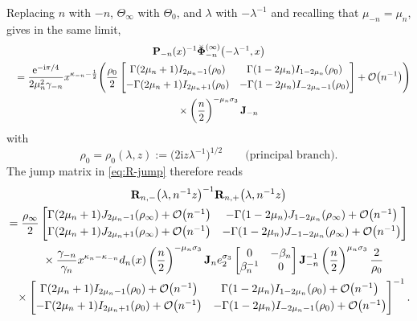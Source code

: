 \documentclass[pdftex]{sigma}
\numberwithin{equation}{section}
\newcommand{\ee}{\mathrm{e}}
\newcommand{\ii}{\mathrm{i}}
\newcommand{\para}[1]{\breve{#1}}
\begin{document}
Replacing $n$ with $-n$, $\Theta_\infty$ with $\Theta_0$, and $\lambda$ with $-\lambda^{-1}$ and recalling that $\mu_{-n} = \mu_n$, gives in the same limit,
\begin{gather*}
 \mathbf{P}_{-n}(x)^{-1}\para{\mathbf{\Phi}}_{-n}^{(\infty)}\bigl(-\lambda^{-1},x\bigr)
\\
 \quad =\frac{\ee^{-\ii\pi/4}}{2\mu_n^2\gamma_{-n}}x^{\kappa_{-n}-\frac{1}{2}}\Bigg(\frac{\rho_0}{2}\begin{bmatrix}{\Gamma(2\mu_n+1)}{} I_{2\mu_n-1}(\rho_0) & {\Gamma(1-2\mu_n)}{} I_{1-2\mu_n}(\rho_0) \vspace{1mm}\\
 -{\Gamma(2\mu_n+1)}{}I_{2\mu_n+1}(\rho_0)&-{\Gamma(1-2\mu_n)}{}I_{-2\mu_n-1}(\rho_0)
 \end{bmatrix} +\mathcal{O}\big(n^{-1}\big)\Bigg)\\
\phantom{ \quad =}{} \times \left(\frac{n}{2}\right)^{-\mu_n \sigma_3}
 \mathbf{J}_{-n}
\end{gather*}
with
\begin{equation}
\rho_0=\rho_0(\lambda,z):=\big(2\ii z\lambda^{-1}\big)^{1/2}\qquad\text{(principal branch)}.
\label{eq:rho-zero-branch}
\end{equation}
The jump matrix in \eqref{eq:R-jump} therefore reads
\begin{gather}
 \mathbf{R}_{n,-}\big(\lambda,n^{-1}z\big)^{-1}
 \mathbf{R}_{n,+}\big(\lambda,n^{-1}z\big) \nonumber\\
 = \frac{\rho_\infty}{2}\begin{bmatrix}
 \Gamma(2\mu_n+1) J_{2\mu_n-1}(\rho_\infty)+ \mathcal{O}\big(n^{-1}\big) & -\Gamma(1-2\mu_n) J_{1-2\mu_n}(\rho_\infty)+ \mathcal{O}\big(n^{-1}\big) \vspace{1mm}\\
 \Gamma(2\mu_n+1) J_{2\mu_n+1}(\rho_\infty)+ \mathcal{O}\big(n^{-1}\big) & -\Gamma(1-2\mu_n) J_{-1-2\mu_n}(\rho_\infty)+ \mathcal{O}\big(n^{-1}\big)
 \end{bmatrix}\nonumber\\
\phantom{ =}{} \times{} \frac{\gamma_{-n}}{\gamma_n}x^{\kappa_n-\kappa_{-n}}d_n(x)\left(\frac{n}{2}\right)^{-\mu_n\sigma_3}\mathbf{J}_ne_2^{\sigma_3}\begin{bmatrix}0 & -\beta_n\\\beta_n^{-1} & 0\end{bmatrix}\mathbf{J}_{-n}^{-1}\left(\frac{n}{2}\right)^{\mu_n\sigma_3}\frac{2}{\rho_0}\nonumber
 \\
\phantom{ =}{}\times \begin{bmatrix}{\Gamma(2\mu_n+1)}{} I_{2\mu_n-1}(\rho_0)+ \mathcal{O}\big(n^{-1}\big) & {\Gamma(1-2\mu_n)}{} I_{1-2\mu_n}(\rho_0)+ \mathcal{O}\big(n^{-1}\big) \vspace{1mm}\\
 -{\Gamma(2\mu_n+1)}{}I_{2\mu_n+1}(\rho_0)+ \mathcal{O}\big(n^{-1}\big)&-{\Gamma(1-2\mu_n)}{}I_{-2\mu_n-1}(\rho_0)+ \mathcal{O}\big(n^{-1}\big)
 \end{bmatrix}^{-1}.
 \label{eq:E-hat-jump-1}
\end{gather}
\end{document}
